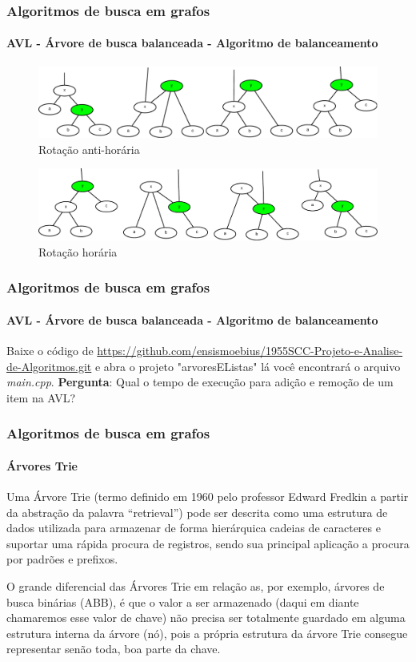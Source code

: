 \begin{frame}
	\frametitle{Algoritmos de busca em grafos}
	\framesubtitle{AVL - Árvore de busca balanceada - Algoritmo de balanceamento}
	\begin{figure}
		\centering
		\includegraphics[width=0.7\linewidth]{images/AVLRotacaoAntiHoraria}
		\caption{Rotação anti-horária}
		\label{fig:avlrotacaoantihoraria}
	\end{figure}
	\begin{figure}
		\centering
		\includegraphics[width=0.7\linewidth]{images/AVLRotacaoHoraria}
		\caption{Rotação horária}
		\label{fig:avlrotacaohoraria}
	\end{figure}
\end{frame}

\begin{frame}
	\frametitle{Algoritmos de busca em grafos}
	\framesubtitle{AVL - Árvore de busca balanceada - Algoritmo de balanceamento}
	\par Baixe o código de \href{https://github.com/ensismoebius/1955SCC-Projeto-e-Analise-de-Algoritmos.git}{https://github.com/ensismoebius/1955SCC-Projeto-e-Analise-de-Algoritmos.git} e abra o projeto "arvoresEListas" lá você encontrará o arquivo \textit{main.cpp}. \textbf{Pergunta}: Qual o tempo de execução para adição e remoção de um item na AVL?
\end{frame}

\begin{frame}
	\frametitle{Algoritmos de busca em grafos}
	\framesubtitle{Árvores Trie}
	\par Uma Árvore Trie (termo definido em 1960 pelo professor Edward Fredkin a
	partir da abstração da palavra “retrieval”) pode ser descrita como uma estrutura de dados utilizada para armazenar de forma hierárquica cadeias de caracteres e suportar uma rápida procura de registros, sendo sua principal aplicação a procura por padrões	e prefixos. \newline
	\par O grande diferencial das Árvores Trie em relação as, por exemplo, árvores de busca binárias (ABB), é que o valor a ser armazenado (daqui em diante chamaremos esse valor de chave) não precisa ser totalmente guardado em alguma estrutura interna da árvore (nó), pois a própria estrutura da árvore Trie consegue representar senão	toda, boa parte da chave.
\end{frame}

